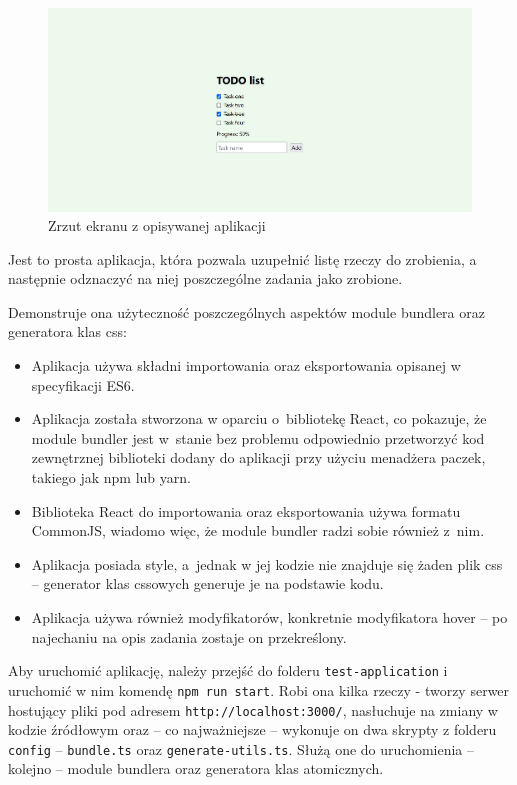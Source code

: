 \documentclass{SGGW-thesis}
\begin{document}
\begin{figure}[h]
    \centering
    \includegraphics[width=\textwidth]{test-app.png}
    \caption{Zrzut ekranu z opisywanej aplikacji}
\end{figure}

Jest to prosta aplikacja, która pozwala uzupełnić listę rzeczy do zrobienia, a następnie odznaczyć na niej poszczególne zadania jako zrobione.

Demonstruje ona użyteczność poszczególnych aspektów module bundlera oraz generatora klas css:
\begin{itemize}
    \item Aplikacja używa składni importowania oraz eksportowania opisanej w specyfikacji ES6.
    \item Aplikacja została stworzona w oparciu o~bibliotekę React, co pokazuje, że module bundler jest w~stanie bez problemu odpowiednio przetworzyć kod zewnętrznej biblioteki dodany do aplikacji przy użyciu menadżera paczek, takiego jak npm lub yarn.
    \item Biblioteka React do importowania oraz eksportowania używa formatu CommonJS, wiadomo więc, że module bundler radzi sobie również z~nim.
    \item Aplikacja posiada style, a~jednak w jej kodzie nie znajduje się żaden plik css -- generator klas cssowych generuje je na podstawie kodu.
    \item Aplikacja używa również modyfikatorów, konkretnie modyfikatora hover -- po najechaniu na opis zadania zostaje on przekreślony.
\end{itemize}

Aby uruchomić aplikację, należy przejść do folderu \verb|test-application| i uruchomić w nim komendę \verb|npm run start|. Robi ona kilka rzeczy - tworzy serwer hostujący pliki pod adresem \verb|http://localhost:3000/|, nasłuchuje na zmiany w kodzie źródłowym oraz -- co najważniejsze -- wykonuje on dwa skrypty z folderu \verb|config| -- \verb|bundle.ts| oraz \verb|generate-utils.ts|. Służą one do uruchomienia -- kolejno -- module bundlera oraz generatora klas atomicznych.
\end{document}
